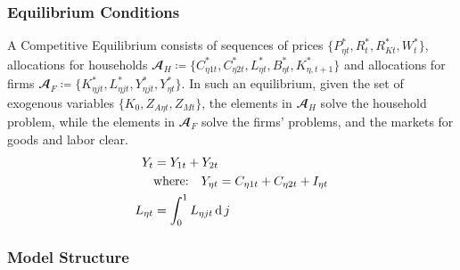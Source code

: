 \documentclass[../thesis.tex]{subfiles}
\begin{document}

\subsubsection{Equilibrium Conditions}


A Competitive Equilibrium consists of sequences of prices $\{P_{\eta t}^{\ast}, R_t^{\ast}, R_{Kt}^{\ast}, W_t^{\ast}\}$, allocations for households $\mathbfscr{A}_H \coloneq \{C_{\eta 1 t}^{\ast}, C_{\eta 2 t}^{\ast}, L_{\eta t}^{\ast}, B_{\eta t}^{\ast}, K_{\eta, t+1}^{\ast}\}$ and allocations  for firms $\mathbfscr{A}_F \coloneq \{K_{\eta jt}^{\ast}, L_{\eta jt}^{\ast}, Y_{\eta jt}^{\ast}, Y_{\eta t}^{\ast}\}$. In such an equilibrium, given the set of exogenous variables $\{K_0, Z_{A\eta t}, Z_{Mt}\}$, the elements in $\mathbfscr{A}_H$ solve the household problem, while the elements in $\mathbfscr{A}_F$ solve the firms' problems, and the markets for goods and labor clear.
\begin{align}
	Y_{t} &= Y_{1 t} + Y_{2 t} \label{eq:reg-market-clearing-condition-Yt} \\
	& \text{where:} \quad Y_{\eta t} = C_{\eta 1 t} + C_{\eta 2 t} + I_{\eta t} \label{eq:reg-regional-demand} \\
	L_{\eta t} &= \int_{0}^{1} L_{\eta jt} \operatorname{d} j \label{eq:reg-market-clearing-condition-Lt}
\end{align}

\begin{comment}
	Define the total demand $Y_{t}$ and the regional demands $Y_{\eta}$:
	\begin{align}
		Y_{t} &= Y_{1 t} + Y_{2 t} \label{eq:reg-total-demand} \\
		& \text{where:} \quad Y_{\eta t} = C_{\eta 1 t} + C_{\eta 2 t} + I_{\eta t} 
	\end{align}
	
	The market clearing conditions are:
\end{comment}



\subsubsection{Model Structure}
\end{document}
